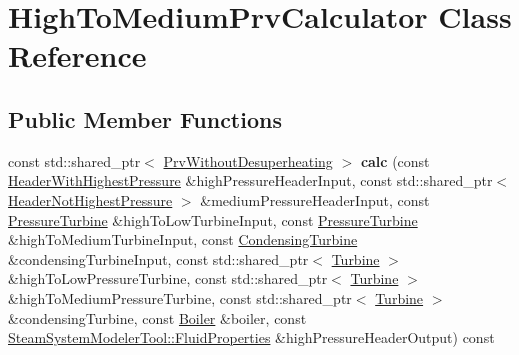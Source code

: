 \hypertarget{class_high_to_medium_prv_calculator}{}\section{High\+To\+Medium\+Prv\+Calculator Class Reference}
\label{class_high_to_medium_prv_calculator}
\subsection*{Public Member Functions}
\begin{DoxyCompactItemize}
\item 
\mbox{\label{class_high_to_medium_prv_calculator_a908d2a579beaa05d9721b3146097fa0d}} 
const std\+::shared\+\_\+ptr$<$ \hyperlink{class_prv_without_desuperheating}{Prv\+Without\+Desuperheating} $>$ {\bfseries calc} (const \hyperlink{class_header_with_highest_pressure}{Header\+With\+Highest\+Pressure} \&high\+Pressure\+Header\+Input, const std\+::shared\+\_\+ptr$<$ \hyperlink{class_header_not_highest_pressure}{Header\+Not\+Highest\+Pressure} $>$ \&medium\+Pressure\+Header\+Input, const \hyperlink{class_pressure_turbine}{Pressure\+Turbine} \&high\+To\+Low\+Turbine\+Input, const \hyperlink{class_pressure_turbine}{Pressure\+Turbine} \&high\+To\+Medium\+Turbine\+Input, const \hyperlink{class_condensing_turbine}{Condensing\+Turbine} \&condensing\+Turbine\+Input, const std\+::shared\+\_\+ptr$<$ \hyperlink{class_turbine}{Turbine} $>$ \&high\+To\+Low\+Pressure\+Turbine, const std\+::shared\+\_\+ptr$<$ \hyperlink{class_turbine}{Turbine} $>$ \&high\+To\+Medium\+Pressure\+Turbine, const std\+::shared\+\_\+ptr$<$ \hyperlink{class_turbine}{Turbine} $>$ \&condensing\+Turbine, const \hyperlink{class_boiler}{Boiler} \&boiler, const \hyperlink{struct_steam_system_modeler_tool_1_1_fluid_properties}{Steam\+System\+Modeler\+Tool\+::\+Fluid\+Properties} \&high\+Pressure\+Header\+Output) const
\item 
\mbox{\label{class_high_to_medium_prv_calculator_adba00fd52835eff7a38c509d0de1d5dd}} 

\end{DoxyCompactItemize}
